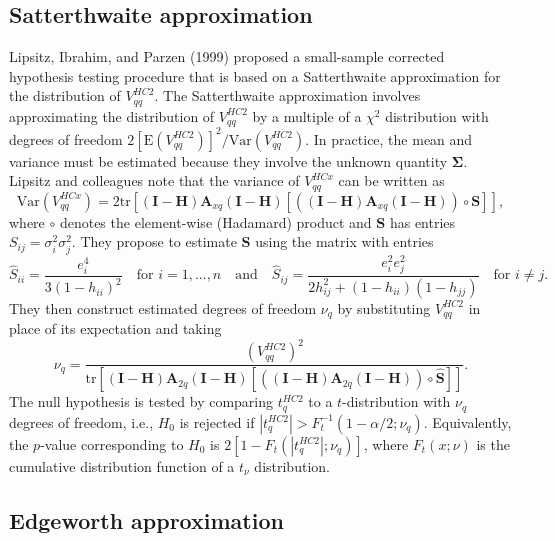 \documentclass{article}\usepackage[]{graphicx}\usepackage[]{color}
\newcommand{\E}{\text{E}}
\newcommand{\Var}{\text{Var}}
\newcommand{\tr}{\text{tr}}
\newcommand{\bm}{\mathbf}
\newcommand{\bs}{\boldsymbol}
\begin{document}
\subsection{Satterthwaite approximation}

Lipsitz, Ibrahim, and Parzen (1999) proposed a small-sample corrected hypothesis testing procedure that is based on a Satterthwaite approximation for the distribution of $V^{HC2}_{qq}$. The Satterthwaite approximation involves approximating the distribution of $V^{HC2}_{qq}$ by a multiple of a $\chi^2$ distribution with degrees of freedom $2 \left[\E\left(V^{HC2}_{qq}\right)\right]^2 / \Var\left(V^{HC2}_{qq}\right)$. In practice, the mean and variance must be estimated because they involve the unknown quantity $\bs\Sigma$. Lipsitz and colleagues note that the variance of $V^{HCx}_{qq}$ can be written as \[
\Var\left(V^{HCx}_{qq}\right) = 2\tr\left[\left(\bm{I} - \bm{H}\right)\bm{A}_{xq} \left(\bm{I} - \bm{H}\right)\left[\left(\left(\bm{I} - \bm{H}\right)\bm{A}_{xq} \left(\bm{I} - \bm{H}\right)\right)\circ \bm{S}\right]\right], \]
where $\circ$ denotes the element-wise (Hadamard) product and $\bm{S}$ has entries $S_{ij} = \sigma_i^2 \sigma_j^2$. They propose to estimate $\bm{S}$ using the matrix with entries \[
\hat{S}_{ii} = \frac{e_i^4}{3(1 - h_{ii})^2} \quad \text{for } i = 1,...,n \quad \text{and} \quad \hat{S}_{ij} = \frac{e_i^2 e_j^2}{2 h_{ij}^2 + (1 - h_{ii})(1 - h_{jj})} \quad \text{for } i \neq j. \]
They then construct estimated degrees of freedom $\nu_q$ by substituting $V^{HC2}_{qq}$ in place of its expectation and taking 
\begin{equation}
\label{eq:Satterthwaite}
\nu_q = \frac{\left(V^{HC2}_{qq}\right)^2}{\tr\left[\left(\bm{I} - \bm{H}\right)\bm{A}_{2q} \left(\bm{I} - \bm{H}\right)\left[\left(\left(\bm{I} - \bm{H}\right)\bm{A}_{2q} \left(\bm{I} - \bm{H}\right)\right)\circ \bm{\hat{S}}\right]\right]}.
\end{equation}
The null hypothesis is tested by comparing $t^{HC2}_q$ to a $t$-distribution with $\nu_q$ degrees of freedom, i.e., $H_0$ is rejected if $|t^{HC2}_q| > F_t^{-1}(1 - \alpha / 2; \nu_q)$. Equivalently, the $p$-value corresponding to $H_0$ is $2 \left[1 - F_t\left(|t_q^{HC2}|; \nu_q\right)\right]$, where $F_t(x; \nu)$ is the cumulative distribution function of a $t_\nu$ distribution.

\subsection{Edgeworth approximation}
\end{document}

